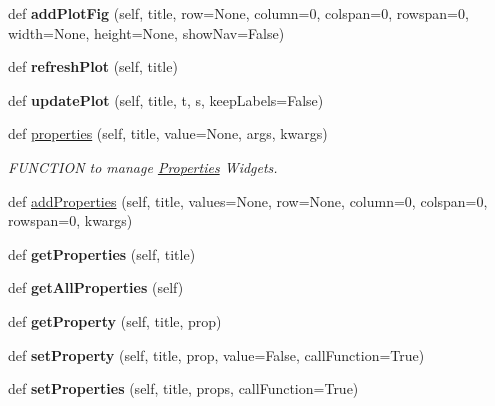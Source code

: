 \begin{DoxyCompactItemize}
def {\bfseries add\+Plot\+Fig} (self, title, row=None, column=0, colspan=0, rowspan=0, width=None, height=None, show\+Nav=False)
\item 
\mbox{\label{classappjar_1_1gui_ae1b4223ea8a6b7b3af47e82194eab888}} 
def {\bfseries refresh\+Plot} (self, title)
\item 
\mbox{\label{classappjar_1_1gui_a5d7140c77ec018335b860e73c24fffef}} 
def {\bfseries update\+Plot} (self, title, t, s, keep\+Labels=False)
\item 
def \hyperlink{classappjar_1_1gui_ae489640bfdf71c1217541d0dc5f77344}{properties} (self, title, value=None, args, kwargs)
\begin{DoxyCompactList}\small\item\em F\+U\+N\+C\+T\+I\+ON to manage \hyperlink{classappjar_1_1_properties}{Properties} Widgets. \end{DoxyCompactList}\item 
def \hyperlink{classappjar_1_1gui_aec43701849ab6ad0bae5a379ee5bffa5}{add\+Properties} (self, title, values=None, row=None, column=0, colspan=0, rowspan=0, kwargs)
\item 
\mbox{\label{classappjar_1_1gui_a834d86a8a16a1eec6a63c7a78f79cc95}} 
def {\bfseries get\+Properties} (self, title)
\item 
\mbox{\label{classappjar_1_1gui_a996ad4e9c8de108072270f9f83891c83}} 
def {\bfseries get\+All\+Properties} (self)
\item 
\mbox{\label{classappjar_1_1gui_a0fafd3aff1a25957c56b9d6d06ac704d}} 
def {\bfseries get\+Property} (self, title, prop)
\item 
\mbox{\label{classappjar_1_1gui_adf515bc7437b74b0bbe5bdbe45273b64}} 
def {\bfseries set\+Property} (self, title, prop, value=False, call\+Function=True)
\item 
\mbox{\label{classappjar_1_1gui_ab2f26638cad2796f7f93eb9f0fa4c403}} 
def {\bfseries set\+Properties} (self, title, props, call\+Function=True)
\item 
\mbox{\label{classappjar_1_1gui_af721eb9074d4e1d6451dfb1f09f27afb}} 

\end{DoxyCompactItemize}
